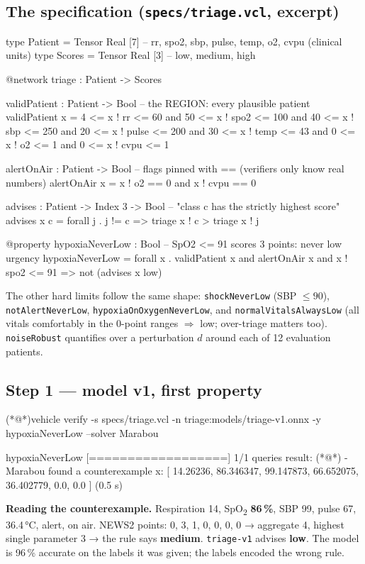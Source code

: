 \documentclass[11pt]{article}
\begin{document}
\subsection*{The specification (\texttt{specs/triage.vcl}, excerpt)}
\begin{vclbox}
type Patient = Tensor Real [7]          -- rr, spo2, sbp, pulse, temp, o2, cvpu (clinical units)
type Scores  = Tensor Real [3]          -- low, medium, high

@network
triage : Patient -> Scores

validPatient : Patient -> Bool          -- the REGION: every plausible patient
validPatient x = 4 <= x ! rr <= 60 and 50 <= x ! spo2 <= 100 and 40 <= x ! sbp <= 250 and
                 20 <= x ! pulse <= 200 and 30 <= x ! temp <= 43 and 0 <= x ! o2 <= 1 and 0 <= x ! cvpu <= 1

alertOnAir : Patient -> Bool            -- flags pinned with == (verifiers only know real numbers)
alertOnAir x = x ! o2 == 0 and x ! cvpu == 0

advises : Patient -> Index 3 -> Bool    -- "class c has the strictly highest score"
advises x c = forall j . j != c => triage x ! c > triage x ! j

@property
hypoxiaNeverLow : Bool                  -- SpO2 <= 91 scores 3 points: never low urgency
hypoxiaNeverLow = forall x . validPatient x and alertOnAir x and x ! spo2 <= 91 => not (advises x low)
\end{vclbox}
The other hard limits follow the same shape: \texttt{shockNeverLow} (SBP $\le 90$), \texttt{notAlertNeverLow}, \texttt{hypoxiaOnOxygenNeverLow}, and \texttt{normalVitalsAlwaysLow} (all vitals comfortably in the 0-point ranges $\Rightarrow$ low; over-triage matters too). \texttt{noiseRobust} quantifies over a perturbation $d$ around each of 12 evaluation patients.

\subsection*{Step 1 — model v1, first property}
\begin{shellbox}
(*@\tprompt@*)vehicle verify -s specs/triage.vcl -n triage:models/triage-v1.onnx -y hypoxiaNeverLow --solver Marabou
\end{shellbox}
\begin{expected}
  hypoxiaNeverLow [==================] 1/1 queries
    result: (*@\tbad@*) - Marabou found a counterexample
      x: [ 14.26236, 86.346347, 99.147873, 66.652075, 36.402779, 0.0, 0.0 ]        (0.5 s)
\end{expected}
\textbf{Reading the counterexample.} Respiration 14, SpO\textsubscript{2} \textbf{86\,\%}, SBP 99, pulse 67, 36.4\,°C, alert, on air. NEWS2 points: 0, 3, 1, 0, 0, 0, 0 → aggregate 4, highest single parameter 3 → the rule says \textbf{medium}. \texttt{triage-v1} advises \textbf{low}. The model is 96\,\% accurate on the labels it was given; the labels encoded the wrong rule. \counterexample
\end{document}
